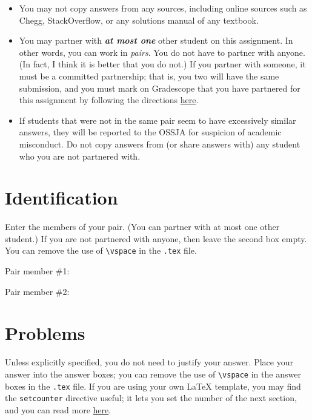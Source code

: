 \documentclass{article}
\begin{document}
\begin{itemize}[itemsep=0mm, parsep=0pt]
\item You may not copy answers from any sources, including online sources such as Chegg, StackOverflow, or any solutions manual of any textbook.
\item You may partner with \textbf{\textit{at most one}} other student on this assignment. In other words, you can work in \textit{pairs}. You do not have to partner with anyone. (In fact, I think it is better that you do not.) If you partner with someone, it must be a committed partnership; that is, you two will have the same submission, and you must mark on Gradescope that you have partnered for this assignment by following the directions \href{https://www.youtube.com/watch?v=rue7p_kATLA}{here}.
\item If students that were not in the same pair seem to have excessively similar answers, they will be reported to the OSSJA for suspicion of academic misconduct. Do not copy answers from (or share answers with) any student who you are not partnered with.
\end{itemize}

\section{Identification}

Enter the members of your pair. (You can partner with at most one other student.) If you are not partnered with anyone, then leave the second box empty. You can remove the use of \lstinline{\vspace} in the \lstinline{.tex} file.

Pair member \#1:

\begin{mdframed}
\vspace{3em}
\end{mdframed}

Pair member \#2:

\begin{mdframed}
\vspace{3em}
\end{mdframed}

\section{Problems}

Unless explicitly specified, you do not need to justify your answer. Place your answer into the answer boxes; you can remove the use of \lstinline{\vspace} in the answer boxes in the \lstinline{.tex} file. If you are using your own LaTeX template, you may find the \lstinline{setcounter} directive useful; it lets you set the number of the next section, and you can read more \href{https://tex.stackexchange.com/questions/200437/numbering-sections-subsections-etc-manually}{here}.
\end{document}
